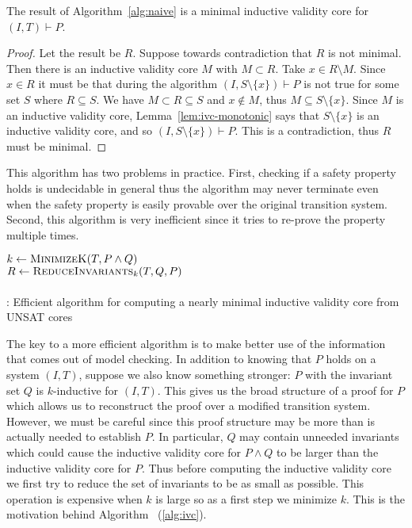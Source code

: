 \begin{lemma}
  The result of Algorithm~\ref{alg:naive} is a minimal inductive validity core
  for $(I, T)\vdash P$.
\end{lemma}
\begin{proof}
  Let the result be $R$. Suppose towards contradiction that $R$ is not
  minimal. Then there is an inductive validity core $M$ with $M
  \subset R$. Take $x \in R\setminus M$. Since $x \in R$ it must be
  that during the algorithm $(I, S\setminus\{x\})\vdash P$ is not true
  for some set $S$ where $R \subseteq S$. We have $M \subset R
  \subseteq S$ and $x\not\in M$, thus $M \subseteq S\setminus \{x\}$.
  Since $M$ is an inductive validity core,
  Lemma~\ref{lem:ivc-monotonic} says that $S\setminus \{x\}$ is an
  inductive validity core, and so $(I, S\setminus\{x\})\vdash P$. This
  is a contradiction, thus $R$ must be minimal.
\end{proof}

This algorithm has two problems in practice. First, checking if a
safety property holds is undecidable in general thus the algorithm may
never terminate even when the safety property is easily provable over
the original transition system. Second, this algorithm is very
inefficient since it tries to re-prove the property multiple times.

\begin{algorithm}[t]
  \BlankLine
  $k \leftarrow \textsc{MinimizeK}(T, P \land Q)$ \\
  $R \leftarrow \textsc{ReduceInvariants}_k(T, Q, P)$ \\
  \\
\caption{\ucalg: Efficient algorithm for computing a nearly minimal inductive validity core from UNSAT cores}
\label{alg:ivc}
\end{algorithm}

The key to a more efficient algorithm is to make better use of the
information that comes out of model checking. In addition to knowing
that $P$ holds on a system $(I, T)$, suppose we also know something
stronger: $P$ with the invariant set $Q$ is $k$-inductive for $(I,
T)$. This gives us the broad structure of a proof for $P$ which allows
us to reconstruct the proof over a modified transition system.
However, we must be careful since this proof structure may be more
than is actually needed to establish $P$. In particular, $Q$ may
contain unneeded invariants which could cause the inductive validity
core for $P \land Q$ to be larger than the inductive validity core for
$P$. Thus before computing the inductive validity core we first try to
reduce the set of invariants to be as small as possible. This
operation is expensive when $k$ is large so as a first step we
minimize $k$. This is the motivation behind
Algorithm \ucalg~(\ref{alg:ivc}).

